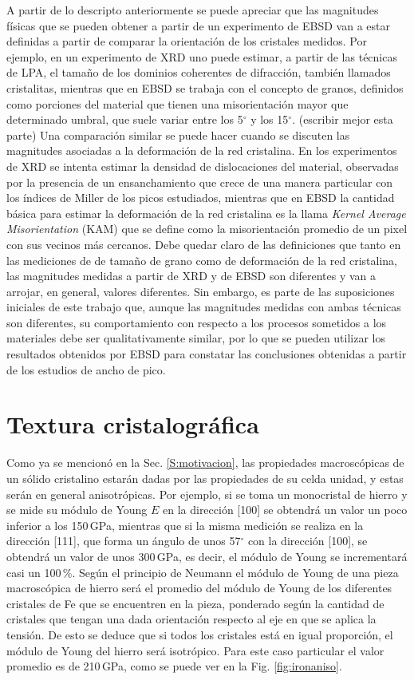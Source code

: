A partir de lo descripto anteriormente se puede apreciar que las magnitudes físicas que se pueden obtener a partir de un experimento de EBSD van a estar definidas a partir de comparar la orientación de los cristales medidos.
Por ejemplo, en un experimento de XRD uno puede estimar, a partir de las técnicas de LPA, el tamaño de los dominios coherentes de difracción, también llamados cristalitas, mientras que en EBSD se trabaja con el concepto de granos, definidos como porciones del material que tienen una misorientación mayor que determinado umbral, que suele variar entre los 5$^{\circ}$ y los 15$^{\circ}$. (escribir mejor esta parte)
Una comparación similar se puede hacer cuando se discuten las magnitudes asociadas a la deformación de la red cristalina. En los experimentos de XRD se intenta estimar la densidad de dislocaciones del material, observadas por la presencia de un ensanchamiento que crece de una manera particular con los índices  de Miller de los picos estudiados, mientras que en EBSD la cantidad básica para estimar la deformación de la red cristalina es la llama \textit{Kernel Average Misorientation} (KAM) que se define como la misorientación promedio de un pixel con sus vecinos más cercanos.
Debe quedar claro de las definiciones que tanto en las mediciones de de tamaño de grano como de deformación de la red cristalina, las magnitudes medidas a partir de XRD y de EBSD son diferentes y van a arrojar, en general, valores diferentes.
Sin embargo, es parte de las suposiciones iniciales de este trabajo que, aunque las magnitudes medidas con ambas técnicas son diferentes, su comportamiento con respecto a los procesos sometidos a los materiales debe ser qualitativamente similar, por lo que se pueden utilizar los resultados obtenidos por EBSD para constatar las conclusiones obtenidas a partir de los estudios de ancho de pico.

\section{Textura cristalográfica}\label{S:Text}
Como ya se mencionó en la Sec. \ref{S:motivacion}, las propiedades macroscópicas de un sólido cristalino estarán dadas por las propiedades de su celda unidad, y estas serán en general anisotrópicas.
Por ejemplo, si se toma un monocristal de hierro y se mide su módulo de Young $E$ en la dirección [100] se obtendrá un valor un poco inferior a los 150\,GPa, mientras que si la misma medición se realiza en la dirección [111], que forma un ángulo de unos 57$^{\circ}$ con la dirección [100], se obtendrá un valor de unos 300\,GPa, es decir, el módulo de Young se incrementará casi un 100\,\%.
Según el principio de Neumann\cite{nye1985physical} el módulo de Young de una pieza macroscópica de hierro será el promedio del módulo de Young de los diferentes cristales de Fe que se encuentren en la pieza, ponderado según la cantidad de cristales que tengan una dada orientación respecto al eje en que se aplica la tensión.
De esto se deduce que si todos los cristales está en igual proporción, el módulo de Young del hierro será isotrópico.
Para este caso particular el valor promedio es de 210\,GPa, como se puede ver en la Fig. \ref{fig:ironaniso}.

